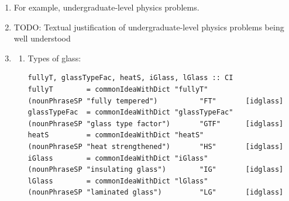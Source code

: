 \documentclass[sigconf,review]{acmart}
\begin{document}
\begin{enumerate}
  \item\label{it:ex:problem} %
    For example, undergraduate-level physics problems.
  \item\label{it:ex:understood} %
    TODO: Textual justification of undergraduate-level physics problems being well understood
  \item\label{it:ex:probdesc} %
    \begin{enumerate}
    \item %
      Types of glass:
      \begin{verbatim}
fullyT, glassTypeFac, heatS, iGlass, lGlass :: CI
fullyT        = commonIdeaWithDict "fullyT"        (nounPhraseSP "fully tempered")          "FT"       [idglass]
glassTypeFac  = commonIdeaWithDict "glassTypeFac"  (nounPhraseSP "glass type factor")       "GTF"      [idglass]
heatS         = commonIdeaWithDict "heatS"         (nounPhraseSP "heat strengthened")       "HS"       [idglass]
iGlass        = commonIdeaWithDict "iGlass"        (nounPhraseSP "insulating glass")        "IG"       [idglass]
lGlass        = commonIdeaWithDict "lGlass"        (nounPhraseSP "laminated glass")         "LG"       [idglass]
      \end{verbatim}


\end{enumerate}
\end{enumerate}
\end{document}
